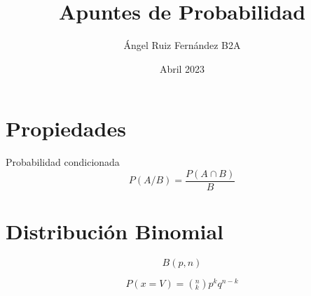 \documentclass[12pt, letterpaper, twoside]{article}
\title{Apuntes de Probabilidad}
\author{Ángel Ruiz Fernández B2A}
\date{Abril 2023}
\begin{document}
	\maketitle
	
	\section{Propiedades}
	Probabilidad condicionada
	\begin{equation}
		P(A/B) = \frac{P(A \cap B)}{B}
	\end{equation}
	
	\section{Distribución Binomial}
	
	\begin{equation}
		B(p, n)
	\end{equation}

	\begin{equation}
		P(x = V) = (_{k}^{n}) p^k q^{n-k}
	\end{equation}
	
	
\end{document}
